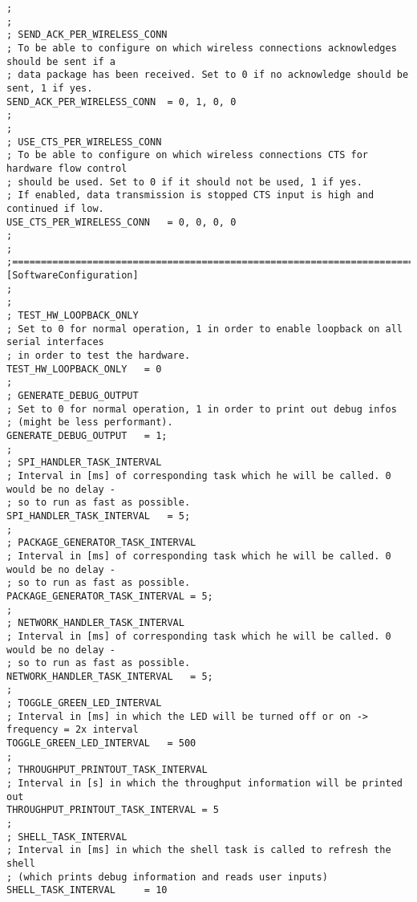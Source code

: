 \begin{lstlisting}
;
;
; SEND_ACK_PER_WIRELESS_CONN
; To be able to configure on which wireless connections acknowledges should be sent if a 
; data package has been received. Set to 0 if no acknowledge should be sent, 1 if yes.
SEND_ACK_PER_WIRELESS_CONN	= 0, 1, 0, 0
;
;
; USE_CTS_PER_WIRELESS_CONN
; To be able to configure on which wireless connections CTS for hardware flow control 
; should be used. Set to 0 if it should not be used, 1 if yes.
; If enabled, data transmission is stopped CTS input is high and continued if low.
USE_CTS_PER_WIRELESS_CONN	= 0, 0, 0, 0
;
;
;========================================================================================
[SoftwareConfiguration]
;
;
; TEST_HW_LOOPBACK_ONLY
; Set to 0 for normal operation, 1 in order to enable loopback on all serial interfaces 
; in order to test the hardware.
TEST_HW_LOOPBACK_ONLY	= 0
;
; GENERATE_DEBUG_OUTPUT
; Set to 0 for normal operation, 1 in order to print out debug infos 
; (might be less performant).
GENERATE_DEBUG_OUTPUT	= 1;
;
; SPI_HANDLER_TASK_INTERVAL
; Interval in [ms] of corresponding task which he will be called. 0 would be no delay - 
; so to run as fast as possible.
SPI_HANDLER_TASK_INTERVAL	= 5;
;
; PACKAGE_GENERATOR_TASK_INTERVAL
; Interval in [ms] of corresponding task which he will be called. 0 would be no delay - 
; so to run as fast as possible.
PACKAGE_GENERATOR_TASK_INTERVAL	= 5;
;
; NETWORK_HANDLER_TASK_INTERVAL
; Interval in [ms] of corresponding task which he will be called. 0 would be no delay - 
; so to run as fast as possible.
NETWORK_HANDLER_TASK_INTERVAL	= 5;
;
; TOGGLE_GREEN_LED_INTERVAL
; Interval in [ms] in which the LED will be turned off or on -> frequency = 2x interval
TOGGLE_GREEN_LED_INTERVAL	= 500
;
; THROUGHPUT_PRINTOUT_TASK_INTERVAL
; Interval in [s] in which the throughput information will be printed out
THROUGHPUT_PRINTOUT_TASK_INTERVAL = 5
;
; SHELL_TASK_INTERVAL
; Interval in [ms] in which the shell task is called to refresh the shell 
; (which prints debug information and reads user inputs)
SHELL_TASK_INTERVAL		= 10
\end{lstlisting}
%